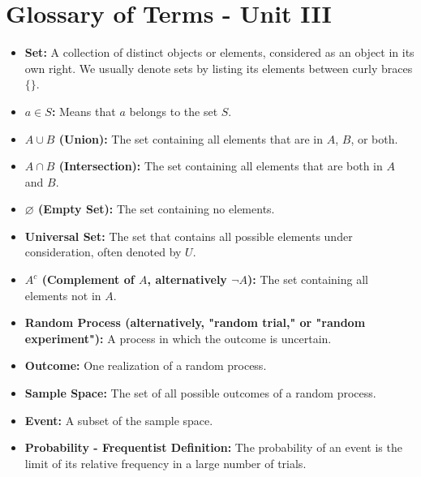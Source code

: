 \documentclass{article}
\let\emptyset\varnothing
\begin{document}
\newpage

\section*{Glossary of Terms - Unit III}

\begin{itemize}
    \item \textbf{Set:} A collection of distinct objects or elements, considered as an object in its own right. We usually denote sets by listing its elements between curly braces $\{\}$.
    
    \item \textbf{\( a \in S \):} Means that \( a \) belongs to the set \( S \).
    
    \item \textbf{\( A \cup B \) (Union):} The set containing all elements that are in \( A \), \( B \), or both.
    
    \item \textbf{\( A \cap B \) (Intersection):} The set containing all elements that are both in \( A \) and \( B \).
    
    \item \textbf{\( \emptyset \) (Empty Set):} The set containing no elements.
    
    \item \textbf{Universal Set:} The set that contains all possible elements under consideration, often denoted by \( U \).
    
    \item \textbf{\( A^c \) (Complement of \( A \), alternatively \( \neg A \)):} The set containing all elements not in \( A \).
    
    \item \textbf{Random Process (alternatively, "random trial," or "random experiment"):} A process in which the outcome is uncertain.
    
    \item \textbf{Outcome:} One realization of a random process.
    
    \item \textbf{Sample Space:} The set of all possible outcomes of a random process.
    
    \item \textbf{Event:} A subset of the sample space.
    
    \item \textbf{Probability - Frequentist Definition:} The probability of an event is the limit of its relative frequency in a large number of trials.
    

\end{itemize}
\end{document}
